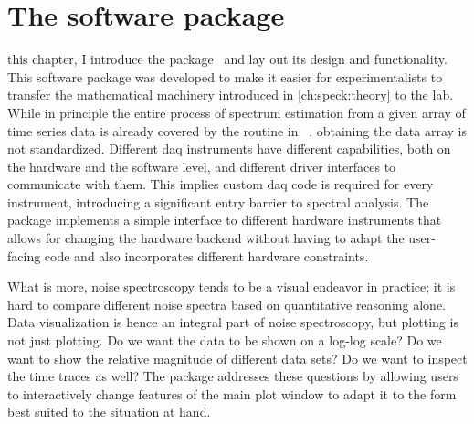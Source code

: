 \chapter{The \pyspeck software package}\label{ch:speck:software}
 this chapter, I introduce the \pyspeck \python package~\cite{Hangleiter_pyspeck}
and lay out its design and functionality.
This software package was developed to make it easier for experimentalists to transfer the mathematical machinery introduced in \cref{ch:speck:theory} to the lab.
While in principle the entire process of spectrum estimation from a given array of time series data is already covered by the  routine in \scipy~, obtaining the data array is not standardized.
Different \gls{daq} instruments have different capabilities, both on the hardware and the software level, and different driver interfaces to communicate with them.
This implies custom \acrlong{daq} code is required for every instrument, introducing a significant entry barrier to spectral analysis.
The \pyspeck package implements a simple interface to different hardware instruments that allows for changing the hardware backend without having to adapt the user-facing code and also incorporates different hardware constraints.

What is more, noise spectroscopy tends to be a visual endeavor in practice; it is hard to compare different noise spectra based on quantitative reasoning alone.
Data visualization is hence an integral part of noise spectroscopy, but plotting is not just plotting.
Do we want the data to be shown on a log-log scale?
Do we want to show the relative magnitude of different data sets?
Do we want to inspect the time traces as well?
The \pyspeck package addresses these questions by allowing users to interactively change features of the main plot window to adapt it to the form best suited to the situation at hand.


